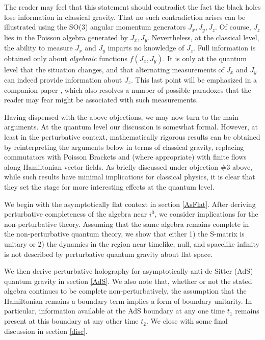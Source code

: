 \documentclass[12pt,onecolumn,eqsecnum,aps,prd,nofootinbib]{revtex4}
\begin{document}
\begin{description}
The reader may feel that this statement should contradict the fact the black holes lose information in classical gravity.  That no such contradiction arises can be illustrated using the SO(3) angular momentum generators $J_x,J_y,J_z$.  Of course, $J_z$ lies in the Poisson algebra generated by $J_x, J_y$.  Nevertheless, at the classical level, the ability to measure $J_x$ and $J_y$ imparts no knowledge of $J_z$. Full information is obtained only about {\it algebraic} functions $f(J_x, J_y)$.  It is only at the quantum level that the situation changes, and that alternating measurements of $J_x$ and $J_y$ can indeed provide information about $J_z$.     This last point will be emphasized in a companion paper \cite{soon}, which also resolves a number of possible paradoxes that the reader may fear might be associated with such measurements.

\end{description}



Having dispensed with the above objections, we may now turn to the main arguments.
At the quantum level our discussion is somewhat formal.  However,  at least in the perturbative context, mathematically rigorous results can be obtained by reinterpreting the arguments below in terms of classical gravity,  replacing commutators with Poisson Brackets and (where appropriate) with finite flows along Hamiltonian vector fields.  As briefly discussed under objection \#3 above, while such results have minimal implications for classical physics, it is clear that they set the stage for more interesting effects at the quantum level.

We begin with the asymptotically flat context in section
\ref{AsFlat}. After deriving perturbative completeness of the algebra near $i^0$, we
consider implications for the non-perturbative theory.  Assuming that the same algebra remains complete in the non-perturbative quantum theory, we show that either 1) the
S-matrix is unitary or 2) the dynamics in the region near timelike,
null, and spacelike infinity is not described by perturbative
quantum gravity about flat space.

We then derive perturbative
holography for asymptotically anti-de Sitter (AdS) quantum gravity in section \ref{AdS}.  We also note that, whether or not the stated algebra continues to be complete non-perturbatively, the
assumption that the Hamiltonian remains a boundary term implies a
form of boundary unitarity.  In particular, information available at
the AdS boundary at any one time $t_1$ remains present at this
boundary at any other time $t_2$. We close with some final
discussion in section \ref{disc}.
\end{document}
